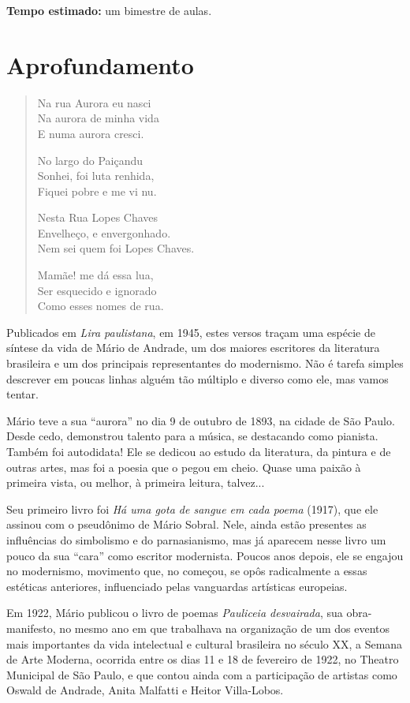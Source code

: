 \documentclass{article}
\begin{document}
\textbf{Tempo estimado:} um bimestre de aulas.

\section{Aprofundamento}

\begin{verse}
Na rua Aurora eu nasci\\
Na aurora de minha vida\\
E numa aurora cresci. 

No largo do Paiçandu\\
Sonhei, foi luta renhida,\\
Fiquei pobre e me vi nu. 

Nesta Rua Lopes Chaves\\
Envelheço, e envergonhado.\\
Nem sei quem foi Lopes Chaves. 

Mamãe! me dá essa lua,\\
Ser esquecido e ignorado\\
Como esses nomes de rua.
\end{verse}

Publicados em
\emph{Lira paulistana}, em 1945, estes versos traçam uma espécie de
síntese da vida de Mário de Andrade, um dos maiores escritores da
literatura brasileira e um dos principais representantes do modernismo.
Não é tarefa simples descrever em poucas linhas alguém tão múltiplo e
diverso como ele, mas vamos tentar.

Mário teve a sua ``aurora'' no dia 9 de outubro de 1893, na cidade de
São Paulo. Desde cedo, demonstrou talento para a música, se destacando
como pianista. Também foi autodidata! Ele se dedicou ao estudo da
literatura, da pintura e de outras artes, mas foi a poesia que o pegou
em cheio. Quase uma paixão à primeira vista, ou melhor, à primeira
leitura, talvez...

Seu primeiro livro foi \emph{Há uma gota de sangue em cada poema}
(1917), que ele assinou com o pseudônimo de Mário Sobral. Nele, ainda
estão presentes as influências do simbolismo e do parnasianismo, mas já
aparecem nesse livro um pouco da sua ``cara'' como escritor modernista.
Poucos anos depois, ele se engajou no modernismo, movimento que, no
começou, se opôs radicalmente a essas estéticas anteriores, influenciado
pelas vanguardas artísticas europeias.

Em 1922, Mário publicou o livro de poemas \emph{Pauliceia desvairada},
sua obra-manifesto, no mesmo ano em que trabalhava na organização de um
dos eventos mais importantes da vida intelectual e cultural brasileira
no século XX, a Semana de Arte Moderna, ocorrida entre os dias 11 e 18
de fevereiro de 1922, no Theatro Municipal de São Paulo, e que contou
ainda com a participação de artistas como Oswald de Andrade, Anita
Malfatti e Heitor Villa-Lobos.
\end{document}
